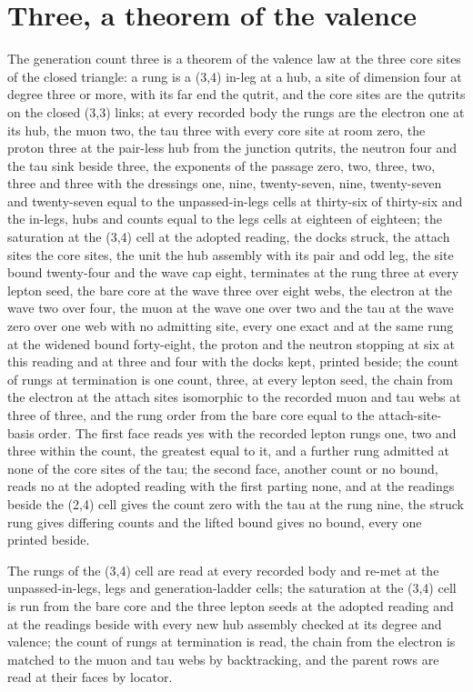 \section{Three, a theorem of the valence}\label{mod:IV-8f-D542664-nctg-t1}
\begin{chtheorem}\label{box:IV-8f-D542664-nctg-t1:1}
The generation count three is a theorem of the valence law at the three core sites of the closed triangle: a rung is a (3,4) in-leg at a hub, a site of dimension four at degree three or more, with its far end the qutrit, and the core sites are the qutrits on the closed (3,3) links; at every recorded body the rungs are the electron one at its hub, the muon two, the tau three with every core site at room zero, the proton three at the pair-less hub from the junction qutrits, the neutron four and the tau sink beside three, the exponents of the passage zero, two, three, two, three and three with the dressings one, nine, twenty-seven, nine, twenty-seven and twenty-seven equal to the unpassed-in-legs cells at thirty-six of thirty-six and the in-legs, hubs and counts equal to the legs cells at eighteen of eighteen; the saturation at the (3,4) cell at the adopted reading, the docks struck, the attach sites the core sites, the unit the hub assembly with its pair and odd leg, the site bound twenty-four and the wave cap eight, terminates at the rung three at every lepton seed, the bare core at the wave three over eight webs, the electron at the wave two over four, the muon at the wave one over two and the tau at the wave zero over one web with no admitting site, every one exact and at the same rung at the widened bound forty-eight, the proton and the neutron stopping at six at this reading and at three and four with the docks kept, printed beside; the count of rungs at termination is one count, three, at every lepton seed, the chain from the electron at the attach sites isomorphic to the recorded muon and tau webs at three of three, and the rung order from the bare core equal to the attach-site-basis order. The first face reads yes with the recorded lepton rungs one, two and three within the count, the greatest equal to it, and a further rung admitted at none of the core sites of the tau; the second face, another count or no bound, reads no at the adopted reading with the first parting none, and at the readings beside the (2,4) cell gives the count zero with the tau at the rung nine, the struck rung gives differing counts and the lifted bound gives no bound, every one printed beside.
\end{chtheorem}
The rungs of the (3,4) cell are read at every recorded body and re-met at the unpassed-in-legs, legs and generation-ladder cells; the saturation at the (3,4) cell is run from the bare core and the three lepton seeds at the adopted reading and at the readings beside with every new hub assembly checked at its degree and valence; the count of rungs at termination is read, the chain from the electron is matched to the muon and tau webs by backtracking, and the parent rows are read at their faces by locator.

